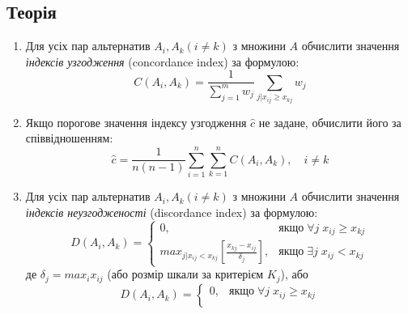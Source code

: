 \subsection{Теорія}
\label{subsec:electre1/theory}

\begin{enumerate}
    \large

    \item
    Для усіх пар альтернатив $A_i, A_k (i \neq k)$ з множини $A$ обчислити значення
    \textit{індексів узгодження} (concordance index) за формулою:
    \begin{equation}
        \label{eq:concordance}
        C(A_i, A_k) =
        \frac{1}{\sum_{j=1}^m w_j}
        \sum_{j|x_{ij} \geq x_{kj}} w_j
    \end{equation}

    \item
    Якщо порогове значення індексу узгодження $\hat c$ не задане,
    обчислити його за співвідношенням:
    \begin{equation}
        \label{eq:concordance_threshold}
        \hat c =
        \frac{1}{n(n-1)}
        \sum_{i=1}^n
        \sum_{k=1}^n C(A_i, A_k),
        \quad i \neq k
    \end{equation}

    \item
    Для усіх пар альтернатив $A_i, A_k (i \neq k)$ з множини $A$ обчислити значення
    \textit{індексів неузгодженості} (discordance index) за формулою:
    \begin{equation}
        \label{eq:discordance0}
        D(A_i, A_k) =
        \begin{cases}
            0,
            & \text{якщо}
            \; \forall j
            \; x_{ij} \geq x_{kj} \\

            max_{j|x_{ij} < x_{kj}}
            [\frac{x_{kj} - x_{ij}}{\delta_j}],
            & \text{якщо}
            \; \exists j
            \; x_{ij} < x_{kj}
        \end{cases}
    \end{equation}
    де $\delta_j = max_i x_{ij}$ (або розмір шкали за критерієм $K_j$), або
    \begin{equation}
        \label{eq:discordance1}
        D(A_i, A_k) =
        \begin{cases}
            0,
            & \text{якщо}
            \; \forall j
            \; x_{ij} \geq x_{kj} \\


\end{cases}
\end{equation}
\end{enumerate}
